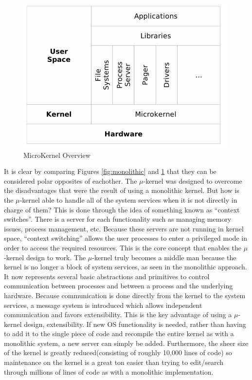 \documentclass[12pt]{article}
\begin{document}
\begin{figure}[h!]
\centering
\includegraphics[width=\linewidth]{pictures/microkernel}
\caption{MicroKernel Overview\cite{Vs}}
\label{fig:microkernel}
\end{figure}

It is clear by comparing Figures \ref{fig:monolithic} and \ref{fig:microkernel} that they can be considered polar opposites of eachother. The $\mu$-kernel was designed to overcome the disadvantages that were the result of using a monolithic kernel. But how is the $\mu$-kernel able to handle all of the system services when it is not directly in charge of them? This is done through the idea of something known as ``context switches''. There is a server for each functionality such as managing memory issues, process management, etc\cite{wiki:micro}. Because these servers are not running in kernel space, ``context switching'' allows the user processes to enter a privileged mode in order to access the required resources. This is the core concept that enables the $\mu$-kernel design to work. The $\mu$-kernel truly becomes a middle man because the kernel is no longer a block of system services, as seen in the monolithic approach. It now represents several basic abstractions and primitives to control communication between processes and between a process and the underlying hardware. Because communication is done directly from the kernel to the system services, a message system is introduced which allows independent communication and favors extensibility\cite{Vs}. This is the key advantage of using a $\mu$-kernel design, extensibility. If new OS functionality is needed, rather than having to add it to the single piece of code and recompile the entire kernel as with a monolithic system, a new server can simply be added. Furthermore, the sheer size of the kernel is greatly reduced(consisting of roughly 10,000 lines of code) so maintenance on the kernel is a great ton easier than trying to edit/search through millions of lines of code as with a monolithic implementation. 
\end{document}
